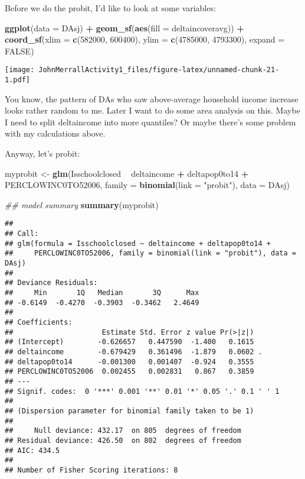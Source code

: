 \documentclass[]{article}
\newenvironment{Shaded}{\begin{snugshade}}{\end{snugshade}}
\newcommand{\CommentTok}[1]{\textcolor[rgb]{0.56,0.35,0.01}{\textit{#1}}}
\newcommand{\DataTypeTok}[1]{\textcolor[rgb]{0.13,0.29,0.53}{#1}}
\newcommand{\DecValTok}[1]{\textcolor[rgb]{0.00,0.00,0.81}{#1}}
\newcommand{\KeywordTok}[1]{\textcolor[rgb]{0.13,0.29,0.53}{\textbf{#1}}}
\newcommand{\NormalTok}[1]{#1}
\newcommand{\OperatorTok}[1]{\textcolor[rgb]{0.81,0.36,0.00}{\textbf{#1}}}
\newcommand{\OtherTok}[1]{\textcolor[rgb]{0.56,0.35,0.01}{#1}}
\newcommand{\StringTok}[1]{\textcolor[rgb]{0.31,0.60,0.02}{#1}}
\begin{document}
Before we do the probit, I'd like to look at some variables:

\begin{Shaded}
\begin{Highlighting}[]
\KeywordTok{ggplot}\NormalTok{(}\DataTypeTok{data =}\NormalTok{ DAsj) }\OperatorTok{+}\StringTok{ }\KeywordTok{geom_sf}\NormalTok{(}\KeywordTok{aes}\NormalTok{(}\DataTypeTok{fill =}\NormalTok{ deltaincoveravg)) }\OperatorTok{+}
\StringTok{  }\KeywordTok{coord_sf}\NormalTok{(}\DataTypeTok{xlim =} \KeywordTok{c}\NormalTok{(}\DecValTok{582000}\NormalTok{, }\DecValTok{600400}\NormalTok{), }\DataTypeTok{ylim =} \KeywordTok{c}\NormalTok{(}\DecValTok{4785000}\NormalTok{, }\DecValTok{4793300}\NormalTok{), }\DataTypeTok{expand =} \OtherTok{FALSE}\NormalTok{)}
\end{Highlighting}
\end{Shaded}

\texttt{[image: JohnMerrallActivity1\_files/figure-latex/unnamed-chunk-21-1.pdf]}

You know, the pattern of DAs who saw above-average household income
increase looks rather random to me. Later I want to do some area
analysis on this. Maybe I need to split deltaincome into more quantiles?
Or maybe there's some problem with my calculations above.

Anyway, let's probit:

\begin{Shaded}
\begin{Highlighting}[]
\NormalTok{myprobit <-}\StringTok{ }\KeywordTok{glm}\NormalTok{(Isschoolclosed }\OperatorTok{~}\StringTok{ }\NormalTok{deltaincome }\OperatorTok{+}\StringTok{ }\NormalTok{deltapop0to14 }\OperatorTok{+}\StringTok{ }\NormalTok{PERCLOWINC0TO52006, }\DataTypeTok{family =} \KeywordTok{binomial}\NormalTok{(}\DataTypeTok{link =} \StringTok{"probit"}\NormalTok{), }\DataTypeTok{data =}\NormalTok{ DAsj)}

\CommentTok{## model summary}
\KeywordTok{summary}\NormalTok{(myprobit)}
\end{Highlighting}
\end{Shaded}

\begin{verbatim}
## 
## Call:
## glm(formula = Isschoolclosed ~ deltaincome + deltapop0to14 + 
##     PERCLOWINC0TO52006, family = binomial(link = "probit"), data = DAsj)
## 
## Deviance Residuals: 
##     Min       1Q   Median       3Q      Max  
## -0.6149  -0.4270  -0.3903  -0.3462   2.4649  
## 
## Coefficients:
##                     Estimate Std. Error z value Pr(>|z|)  
## (Intercept)        -0.626657   0.447590  -1.400   0.1615  
## deltaincome        -0.679429   0.361496  -1.879   0.0602 .
## deltapop0to14      -0.001300   0.001407  -0.924   0.3555  
## PERCLOWINC0TO52006  0.002455   0.002831   0.867   0.3859  
## ---
## Signif. codes:  0 '***' 0.001 '**' 0.01 '*' 0.05 '.' 0.1 ' ' 1
## 
## (Dispersion parameter for binomial family taken to be 1)
## 
##     Null deviance: 432.17  on 805  degrees of freedom
## Residual deviance: 426.50  on 802  degrees of freedom
## AIC: 434.5
## 
## Number of Fisher Scoring iterations: 8
\end{verbatim}
\end{document}
